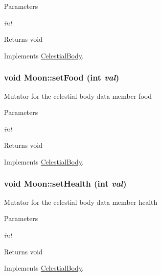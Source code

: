 \begin{DoxyParams}{Parameters}
\item[{\em int}]\end{DoxyParams}
\begin{DoxyReturn}{Returns}
void 
\end{DoxyReturn}


Implements \hyperlink{classCelestialBody}{CelestialBody}.

\hypertarget{classMoon_a525d52c5f9c8582d2e81dfc30f97dd1c}{
\subsubsection[{setFood}]{\setlength{\rightskip}{0pt plus 5cm}void Moon::setFood (int {\em val})}}
\label{d8/d6f/classMoon_a525d52c5f9c8582d2e81dfc30f97dd1c}
Mutator for the celestial body data member food


\begin{DoxyParams}{Parameters}
\item[{\em int}]\end{DoxyParams}
\begin{DoxyReturn}{Returns}
void 
\end{DoxyReturn}


Implements \hyperlink{classCelestialBody}{CelestialBody}.

\hypertarget{classMoon_ae6ba20c5d4f9b6ac33d35d2e31452089}{
\subsubsection[{setHealth}]{\setlength{\rightskip}{0pt plus 5cm}void Moon::setHealth (int {\em val})}}
\label{d8/d6f/classMoon_ae6ba20c5d4f9b6ac33d35d2e31452089}
Mutator for the celestial body data member health


\begin{DoxyParams}{Parameters}
\item[{\em int}]\end{DoxyParams}
\begin{DoxyReturn}{Returns}
void 
\end{DoxyReturn}


Implements \hyperlink{classCelestialBody}{CelestialBody}.

